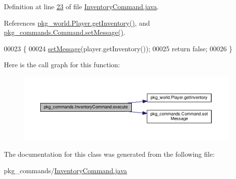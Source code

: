 Definition at line \hyperlink{InventoryCommand_8java_source_l00023}{23} of file \hyperlink{InventoryCommand_8java_source}{Inventory\-Command.\-java}.



References \hyperlink{Player_8java_source_l00223}{pkg\-\_\-world.\-Player.\-get\-Inventory()}, and \hyperlink{Command_8java_source_l00089}{pkg\-\_\-commands.\-Command.\-set\-Message()}.


\begin{DoxyCode}
00023                                           \{
00024         \hyperlink{classpkg__commands_1_1Command_ae210ff216fe908b111ba1c988a963d13}{setMessage}(player.getInventory());
00025         \textcolor{keywordflow}{return} \textcolor{keyword}{false};
00026     \}
\end{DoxyCode}


Here is the call graph for this function\-:
\nopagebreak
\begin{figure}[H]
\begin{center}
\leavevmode
\includegraphics[width=350pt]{classpkg__commands_1_1InventoryCommand_a16ce9e3db461ecb7c4a50d2bdef65022_cgraph}
\end{center}
\end{figure}




The documentation for this class was generated from the following file\-:\begin{DoxyCompactItemize}
\item 
pkg\-\_\-commands/\hyperlink{InventoryCommand_8java}{Inventory\-Command.\-java}\end{DoxyCompactItemize}
